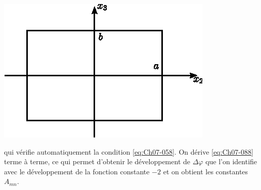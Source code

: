 \begin{center}
        \includegraphics{../images/T1_Ch07-17}
    \end{center}

qui vérifie automatiquement la condition \eqref{eq:Ch07-058}.
On dérive \eqref{eq:Ch07-088} terme à terme, ce qui permet  d'obtenir le développement de $\Delta\varphi$ que l'on identifie  avec le développement de la fonction constante $-2$ et  on  obtient les  constantes $A_{mn}$.

